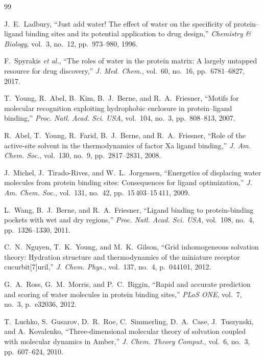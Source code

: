 \documentclass[11pt,letterpaper]{article}
\begin{document}

\begin{thebibliography}{99}

J.~E.~Ladbury,
``Just add water! The effect of water on the specificity of protein--ligand
binding sites and its potential application to drug design,''
\emph{Chemistry \& Biology}, vol.~3, no.~12, pp.~973--980, 1996.

F.~Spyrakis \emph{et al.},
``The roles of water in the protein matrix: A largely untapped resource for
drug discovery,''
\emph{J. Med. Chem.}, vol.~60, no.~16, pp.~6781--6827, 2017.

T.~Young, R.~Abel, B.~Kim, B.~J.~Berne, and R.~A.~Friesner,
``Motifs for molecular recognition exploiting hydrophobic enclosure in
protein--ligand binding,''
\emph{Proc. Natl. Acad. Sci. USA}, vol.~104, no.~3, pp.~808--813, 2007.

R.~Abel, T.~Young, R.~Farid, B.~J.~Berne, and R.~A.~Friesner,
``Role of the active-site solvent in the thermodynamics of factor Xa ligand
binding,''
\emph{J. Am. Chem. Soc.}, vol.~130, no.~9, pp.~2817--2831, 2008.

J.~Michel, J.~Tirado-Rives, and W.~L.~Jorgensen,
``Energetics of displacing water molecules from protein binding sites:
Consequences for ligand optimization,''
\emph{J. Am. Chem. Soc.}, vol.~131, no.~42, pp.~15\,403--15\,411, 2009.

L.~Wang, B.~J.~Berne, and R.~A.~Friesner,
``Ligand binding to protein-binding pockets with wet and dry regions,''
\emph{Proc. Natl. Acad. Sci. USA}, vol.~108, no.~4, pp.~1326--1330, 2011.

C.~N.~Nguyen, T.~K.~Young, and M.~K.~Gilson,
``Grid inhomogeneous solvation theory: Hydration structure and thermodynamics
of the miniature receptor cucurbit[7]uril,''
\emph{J. Chem. Phys.}, vol.~137, no.~4, p.~044101, 2012.

G.~A.~Ross, G.~M.~Morris, and P.~C.~Biggin,
``Rapid and accurate prediction and scoring of water molecules in protein
binding sites,''
\emph{PLoS ONE}, vol.~7, no.~3, p.~e32036, 2012.

T.~Luchko, S.~Gusarov, D.~R.~Roe, C.~Simmerling, D.~A.~Case, J.~Tuszynski,
and A.~Kovalenko,
``Three-dimensional molecular theory of solvation coupled with molecular
dynamics in Amber,''
\emph{J. Chem. Theory Comput.}, vol.~6, no.~3, pp.~607--624, 2010.


\end{thebibliography}
\end{document}
